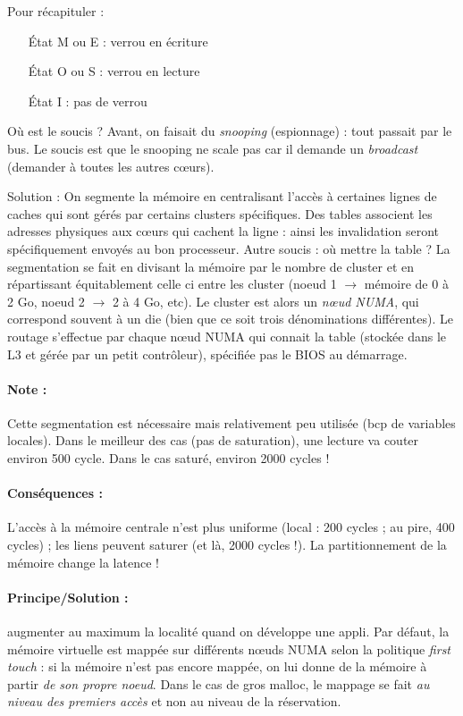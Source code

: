 \documentclass{article}
\begin{document}
Pour récapituler :
\begin{itemize}
\item[État M ou E :] verrou en écriture
\item[État O ou S :] verrou en lecture
\item[État I :] pas de verrou
\end{itemize}
\bigskip

Où est le soucis ? Avant, on faisait du \emph{snooping} (espionnage) : tout passait par le bus. Le soucis est que le snooping ne scale pas car il demande un \emph{broadcast} (demander à toutes les autres cœurs).

Solution : On segmente la mémoire en centralisant l'accès à certaines lignes de caches qui sont gérés par certains clusters spécifiques. Des tables associent les adresses physiques aux cœurs qui cachent la ligne : ainsi les invalidation seront spécifiquement envoyés au bon processeur. Autre soucis : où mettre la table ? La segmentation se fait en divisant la mémoire par le nombre de cluster et en répartissant équitablement celle ci entre les cluster (noeud 1 $\to$ mémoire de 0 à 2 Go, noeud 2 $\to$ 2 à 4 Go, etc). Le cluster est alors un \emph{nœud NUMA}, qui correspond souvent à un die (bien que ce soit trois dénominations différentes). Le routage s'effectue par chaque nœud NUMA qui connait la table (stockée dans le L3 et gérée par un petit contrôleur), spécifiée pas le BIOS au démarrage.

\paragraph{Note :}
Cette segmentation est nécessaire mais relativement peu utilisée (bcp de variables locales). Dans le meilleur des cas (pas de saturation), une lecture va couter environ 500 cycle. Dans le cas saturé, environ 2000 cycles !

\paragraph{Conséquences :}
L'accès à la mémoire centrale n'est plus uniforme (local : 200 cycles ; au pire, 400 cycles) ; les liens peuvent saturer (et là, 2000 cycles !). La partitionnement de la mémoire change la latence !

\paragraph{Principe/Solution :} augmenter au maximum la localité quand on développe une appli. Par défaut, la mémoire virtuelle est mappée sur différents nœuds NUMA selon la politique \emph{first touch} : si la mémoire n'est pas encore mappée, on lui donne de la mémoire à partir \emph{de son propre noeud}. Dans le cas de gros malloc, le mappage se fait \emph{au niveau des premiers accès} et non au niveau de la réservation.
\end{document}
